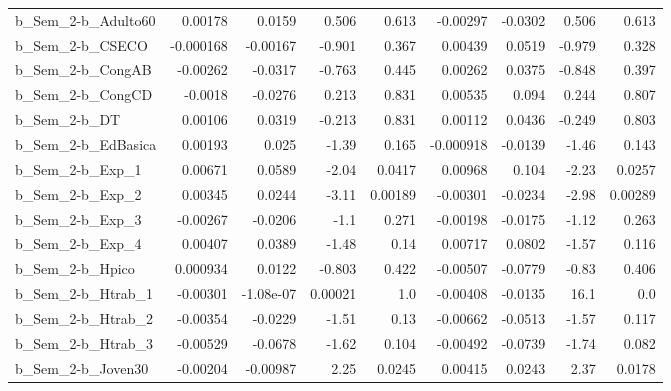 \begin{tabular}{lrrrrrrrr}
b\_Sem\_2-b\_Adulto60         &     0.00178 &       0.0159 &     0.506 &    0.613 &   -0.00297 &     -0.0302 &        0.506 &         0.613 \\
b\_Sem\_2-b\_CSECO            &   -0.000168 &     -0.00167 &    -0.901 &    0.367 &    0.00439 &      0.0519 &       -0.979 &         0.328 \\
b\_Sem\_2-b\_CongAB           &    -0.00262 &      -0.0317 &    -0.763 &    0.445 &    0.00262 &      0.0375 &       -0.848 &         0.397 \\
b\_Sem\_2-b\_CongCD           &     -0.0018 &      -0.0276 &     0.213 &    0.831 &    0.00535 &       0.094 &        0.244 &         0.807 \\
b\_Sem\_2-b\_DT               &     0.00106 &       0.0319 &    -0.213 &    0.831 &    0.00112 &      0.0436 &       -0.249 &         0.803 \\
b\_Sem\_2-b\_EdBasica         &     0.00193 &        0.025 &     -1.39 &    0.165 &  -0.000918 &     -0.0139 &        -1.46 &         0.143 \\
b\_Sem\_2-b\_Exp\_1            &     0.00671 &       0.0589 &     -2.04 &   0.0417 &    0.00968 &       0.104 &        -2.23 &        0.0257 \\
b\_Sem\_2-b\_Exp\_2            &     0.00345 &       0.0244 &     -3.11 &  0.00189 &   -0.00301 &     -0.0234 &        -2.98 &       0.00289 \\
b\_Sem\_2-b\_Exp\_3            &    -0.00267 &      -0.0206 &      -1.1 &    0.271 &   -0.00198 &     -0.0175 &        -1.12 &         0.263 \\
b\_Sem\_2-b\_Exp\_4            &     0.00407 &       0.0389 &     -1.48 &     0.14 &    0.00717 &      0.0802 &        -1.57 &         0.116 \\
b\_Sem\_2-b\_Hpico            &    0.000934 &       0.0122 &    -0.803 &    0.422 &   -0.00507 &     -0.0779 &        -0.83 &         0.406 \\
b\_Sem\_2-b\_Htrab\_1          &    -0.00301 &    -1.08e-07 &   0.00021 &      1.0 &   -0.00408 &     -0.0135 &         16.1 &           0.0 \\
b\_Sem\_2-b\_Htrab\_2          &    -0.00354 &      -0.0229 &     -1.51 &     0.13 &   -0.00662 &     -0.0513 &        -1.57 &         0.117 \\
b\_Sem\_2-b\_Htrab\_3          &    -0.00529 &      -0.0678 &     -1.62 &    0.104 &   -0.00492 &     -0.0739 &        -1.74 &         0.082 \\
b\_Sem\_2-b\_Joven30          &    -0.00204 &     -0.00987 &      2.25 &   0.0245 &    0.00415 &      0.0243 &         2.37 &        0.0178 \\

\end{tabular}
